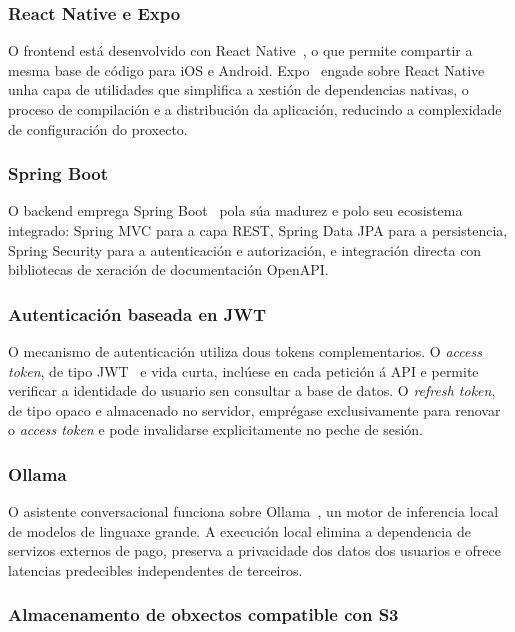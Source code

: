 \subsubsection*{React Native e Expo}

O frontend está desenvolvido con React Native~\cite{reactnative}, o que permite compartir a mesma base
de código para iOS e Android. Expo~\cite{expo} engade sobre React Native unha capa de utilidades
que simplifica a xestión de dependencias nativas, o proceso de compilación e a
distribución da aplicación, reducindo a complexidade de configuración do proxecto.

\subsubsection*{Spring Boot}

O backend emprega Spring Boot~\cite{springboot} pola súa madurez e polo seu ecosistema integrado: Spring
MVC para a capa REST, Spring Data JPA para a persistencia, Spring Security para a
autenticación e autorización, e integración directa con bibliotecas de xeración de
documentación OpenAPI.

\subsubsection*{Autenticación baseada en JWT}

O mecanismo de autenticación utiliza dous tokens complementarios. O \textit{access
token}, de tipo JWT~\cite{rfc7519} e vida curta, inclúese en cada petición á API e permite verificar
a identidade do usuario sen consultar a base de datos. O \textit{refresh token}, de
tipo opaco e almacenado no servidor, emprégase exclusivamente para renovar o
\textit{access token} e pode invalidarse explicitamente no peche de sesión.

\subsubsection*{Ollama}

O asistente conversacional funciona sobre Ollama~\cite{ollama}, un motor de inferencia local de
modelos de linguaxe grande. A execución local elimina a dependencia de servizos
externos de pago, preserva a privacidade dos datos dos usuarios e ofrece latencias
predecibles independentes de terceiros.

\subsubsection*{Almacenamento de obxectos compatible con S3}


